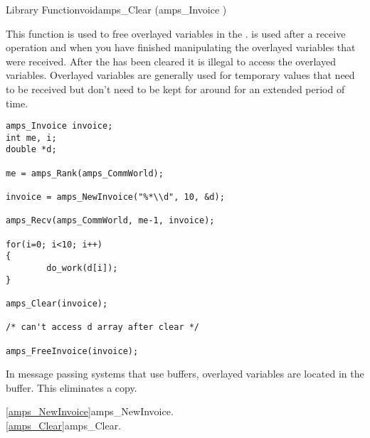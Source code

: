 
\begin{deftypefn}{Library Function}{void}{amps\_Clear}
(amps_Invoice )

\DESCRIPTION

This function is used to free overlayed variables in the
.   is used after a receive operation
and when you have finished manipulating the overlayed variables that
were received.  After the  has been cleared it is illegal
to access the overlayed variables.  Overlayed variables are generally
used for temporary values that need to be received but don't need to
be kept for around for an extended period of time.

\EXAMPLE
\begin{display}\begin{verbatim}
amps_Invoice invoice;
int me, i;
double *d;

me = amps_Rank(amps_CommWorld);

invoice = amps_NewInvoice("%*\\d", 10, &d);

amps_Recv(amps_CommWorld, me-1, invoice);

for(i=0; i<10; i++)
{
        do_work(d[i]);
}

amps_Clear(invoice);

/* can't access d array after clear */

amps_FreeInvoice(invoice);
\end{verbatim}\end{display}

\NOTES

In message passing systems that use buffers, overlayed variables are
located in the buffer.  This eliminates a copy.

\SEEALSO
\vref{amps_NewInvoice}{amps\_NewInvoice}. \\
\vref{amps_Clear}{amps\_Clear}. \\

\end{deftypefn}

